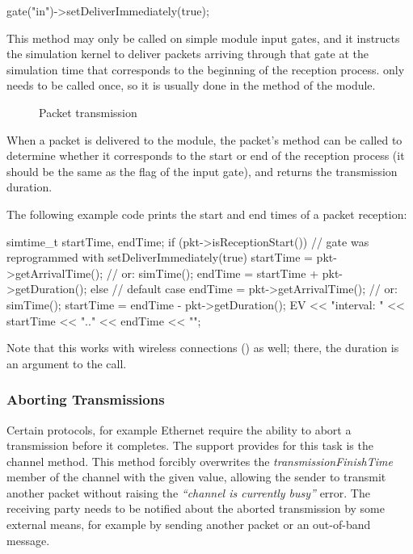 \begin{cpp}
gate("in")->setDeliverImmediately(true);
\end{cpp}

This method may only be called on simple module input gates, and it
instructs the simulation kernel to deliver packets arriving through
that gate at the simulation time that corresponds to the
beginning of the reception process.
 only needs to be called once,
so it is usually done in the  method of the module.

\begin{figure}[htbp]
  \begin{center}
    
    \caption{Packet transmission}
    \label{fig:ch-simple-modules:transmission}
  \end{center}
\end{figure}

When a packet is delivered to the module, the packet's
 method can be called to determine
whether it corresponds to the start or end of the reception
process (it should be the same as the 
flag of the input gate), and  returns the transmission
duration.

The following example code prints the start and end times of a packet reception:

\begin{cpp}
simtime_t startTime, endTime;
if (pkt->isReceptionStart()) {
    // gate was reprogrammed with setDeliverImmediately(true)
    startTime = pkt->getArrivalTime(); // or: simTime();
    endTime = startTime + pkt->getDuration();
}
else {
    // default case
    endTime = pkt->getArrivalTime(); // or: simTime();
    startTime = endTime - pkt->getDuration();
}
EV << "interval: " << startTime << ".." << endTime << "\n";
\end{cpp}

Note that this works with wireless connections ()
as well; there, the duration is an argument to the 
call.

\subsubsection{Aborting Transmissions}
\label{sec:simple-modules:aborting-transmissions}

Certain protocols, for example Ethernet require the ability to abort
a transmission before it completes. The support {\opp} provides
for this task is the  channel method.
This method forcibly overwrites the \textit{transmissionFinishTime}
member of the channel with the given value, allowing the sender to transmit
another packet without raising the \textit{``channel is currently busy''}
error. The receiving party needs to be notified about the aborted transmission
by some external means, for example by sending another packet or an
out-of-band message.

